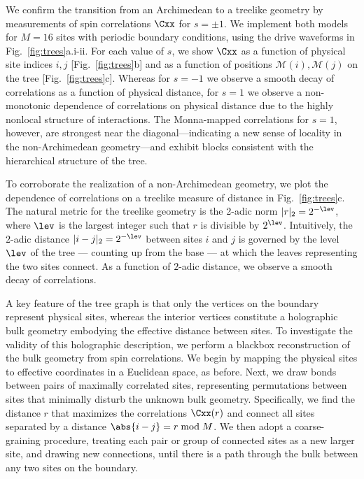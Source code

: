 \documentclass[aps,pra,twocolumn,superscriptaddress]{revtex4-1} %
\begin{document}
\begin{bibunit}
We confirm the transition from an Archimedean to a treelike geometry by
measurements of spin correlations $\Cxx$ for $s = \pm 1$.  We implement both models for $M=16$ sites with periodic boundary conditions, using the drive waveforms in Fig.~\ref{fig:trees}a.i-ii.  For each value of $s$, we show $\Cxx$ as a function of physical site indices $i,j$ [Fig.~\ref{fig:trees}b] and as a function of positions $\mathcal{M}(i), \mathcal{M}(j)$ on the tree [Fig.~\ref{fig:trees}c].  Whereas for $s = -1$ we observe a smooth decay of correlations as a function of physical distance, for $s = 1$ we observe a non-monotonic dependence of correlations on physical distance due to the highly nonlocal structure of interactions.  The Monna-mapped correlations for $s=1$, however, are strongest near the diagonal---indicating a new sense of locality in the non-Archimedean geometry---and exhibit blocks consistent with the hierarchical structure of the tree.

To corroborate the realization of a non-Archimedean geometry, we plot the dependence of correlations on a treelike measure of distance in Fig.~\ref{fig:trees}c.  The natural metric for the treelike geometry is the 2-adic norm $|r|_2 = 2^{-\lev}$, where $\lev$ is the largest integer such that $r$ is divisible by $2^\lev$.  Intuitively, the $2$-adic distance $|i-j|_2 = 2^{-\lev}$ between sites $i$ and $j$ is governed by the level $\lev$ of the tree --- counting up from the base --- at which the leaves representing the two sites connect.  As a function of $2$-adic distance, we observe a smooth decay of correlations.

A key feature of the tree graph is that only the vertices on the boundary represent physical sites, whereas the interior vertices constitute a holographic bulk geometry embodying the effective distance between sites.  To investigate the validity of this holographic description, we perform a blackbox reconstruction of the bulk geometry from spin correlations.  We begin by mapping the physical sites to effective coordinates in a Euclidean space, as before.  Next, we draw bonds between pairs of maximally correlated sites, representing permutations between sites that minimally disturb the unknown bulk geometry. Specifically, we find the distance $r$ that maximizes the correlations $\Cxx(r)$ and connect all sites separated by a distance $\abs{i-j}=r\bmod M$. We then adopt a coarse-graining procedure, treating each pair or group of connected sites as a new larger site, and drawing new connections, until there is a path through the bulk between any two sites on the boundary.  


\end{bibunit}
\end{document}
